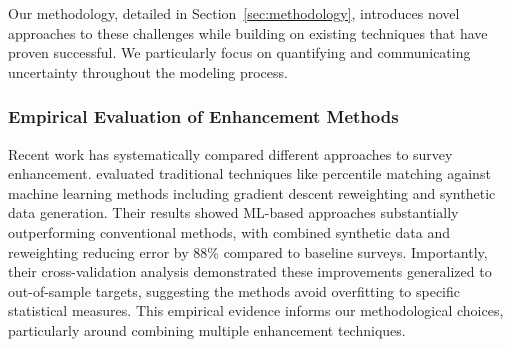 Our methodology, detailed in Section~\ref{sec:methodology}, introduces novel approaches to these challenges while building on existing techniques that have proven successful. We particularly focus on quantifying and communicating uncertainty throughout the modeling process.

\subsubsection{Empirical Evaluation of Enhancement Methods}

Recent work has systematically compared different approaches to survey enhancement. \citet{woodruff2023survey} evaluated traditional techniques like percentile matching against machine learning methods including gradient descent reweighting and synthetic data generation. Their results showed ML-based approaches substantially outperforming conventional methods, with combined synthetic data and reweighting reducing error by 88\% compared to baseline surveys. Importantly, their cross-validation analysis demonstrated these improvements generalized to out-of-sample targets, suggesting the methods avoid overfitting to specific statistical measures. This empirical evidence informs our methodological choices, particularly around combining multiple enhancement techniques.